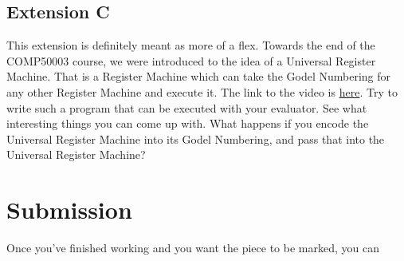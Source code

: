 \documentclass{report}
\begin{document}
\subsection*{Extension C}
This extension is definitely meant as more of a flex. Towards the end of the
COMP50003 course, we were introduced to the idea of a Universal Register Machine.
That is a Register Machine which can take the Godel Numbering for any other Register
Machine and execute it. The link to the video is 
\href{https://imperial.cloud.panopto.eu/Panopto/Pages/Viewer.aspx?id=d3732fc3-0d12-40be-9e41-aded00929300}{here}.
Try to write such a program that can be executed with your evaluator. See what interesting
things you can come up with. What happens if you encode the Universal Register Machine
into its Godel Numbering, and pass that into the Universal Register Machine?

\section*{Submission}
Once you've finished working and you want the piece to be marked, you can 
\end{document}
